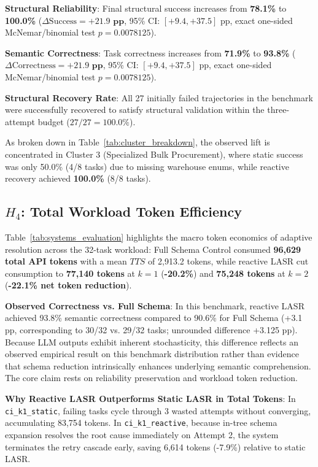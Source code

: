 \noindent\textbf{Structural Reliability}: Final structural success increases from \textbf{78.1\%} to \textbf{100.0\%} ($\Delta\text{Success} = \mathbf{+21.9\text{ pp}}$, 95\% CI: $[+9.4, +37.5]\text{ pp}$, exact one-sided McNemar/binomial test $p = 0.0078125$).

\noindent\textbf{Semantic Correctness}: Task correctness increases from \textbf{71.9\%} to \textbf{93.8\%} ($\Delta\text{Correctness} = \mathbf{+21.9\text{ pp}}$, 95\% CI: $[+9.4, +37.5]\text{ pp}$, exact one-sided McNemar/binomial test $p = 0.0078125$).

\noindent\textbf{Structural Recovery Rate}: All 27 initially failed trajectories in the benchmark were successfully recovered to satisfy structural validation within the three-attempt budget ($27/27 = 100.0\%$).

As broken down in Table~\ref{tab:cluster_breakdown}, the observed lift is concentrated in Cluster 3 (Specialized Bulk Procurement), where static success was only 50.0\% (4/8 tasks) due to missing warehouse enums, while reactive recovery achieved \textbf{100.0\%} (8/8 tasks).



\subsection{$H_4$: Total Workload Token Efficiency}
Table~\ref{tab:systems_evaluation} highlights the macro token economics of adaptive resolution across the 32-task workload: Full Schema Control consumed \textbf{96,629 total API tokens} with a mean $TTS$ of 2,913.2 tokens, while reactive LASR cut consumption to \textbf{77,140 tokens} at $k=1$ (\textbf{-20.2\%}) and \textbf{75,248 tokens} at $k=2$ (\textbf{-22.1\% net token reduction}).

\textbf{Observed Correctness vs. Full Schema}: In this benchmark, reactive LASR achieved 93.8\% semantic correctness compared to 90.6\% for Full Schema (+3.1 pp, corresponding to 30/32 vs. 29/32 tasks; unrounded difference +3.125 pp). Because LLM outputs exhibit inherent stochasticity, this difference reflects an observed empirical result on this benchmark distribution rather than evidence that schema reduction intrinsically enhances underlying semantic comprehension. The core claim rests on reliability preservation and workload token reduction.

\textbf{Why Reactive LASR Outperforms Static LASR in Total Tokens}: In \texttt{ci\_k1\_static}, failing tasks cycle through 3 wasted attempts without converging, accumulating 83,754 tokens. In \texttt{ci\_k1\_reactive}, because in-tree schema expansion resolves the root cause immediately on Attempt 2, the system terminates the retry cascade early, saving 6,614 tokens (-7.9\%) relative to static LASR.


